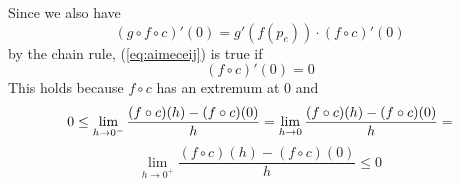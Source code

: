 \documentclass[12pt]{article}
\begin{document}
Since we also have
\begin{equation}
  \label{eq:quauluog}
  (g\circ{}f\circ{}c)'(0)=g'(f(p_{e}))\cdot(f\circ{}c)'(0)
\end{equation}
by the chain rule, (\ref{eq:aimeceij}) is true if
\begin{equation}
  \label{eq:ohnienga}
  (f\circ{}c)'(0)=0
\end{equation}
This holds because $f\circ{}c$ has an extremum at $0$ and
\begin{equation}
  \label{eq:fiofooci}
  0\leq\lim_{h\rightarrow{}0^{-}}\frac{(f\circ{}c)(h)-(f\circ{}c)(0)}{h}=\lim_{h\rightarrow{}0}\frac{(f\circ{}c)(h)-(f\circ{}c)(0)}{h}=\notag
\end{equation}
\begin{equation}
  \label{eq:shohcath}
  \lim_{h\rightarrow{}0^{+}}\frac{(f\circ{}c)(h)-(f\circ{}c)(0)}{h}\leq{}0
\end{equation}

 

\end{document}
